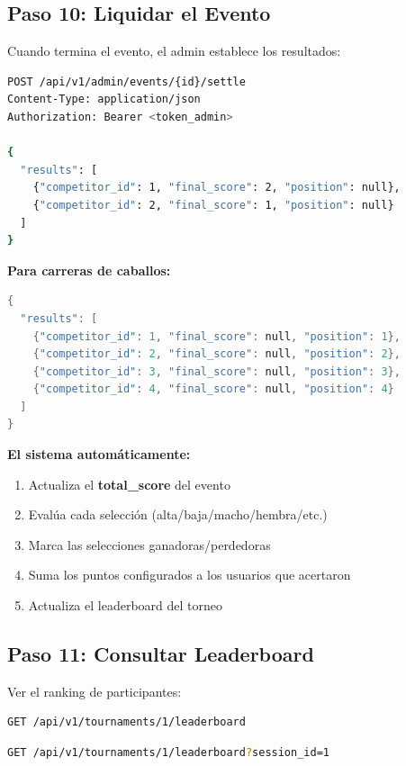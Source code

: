 \documentclass[12pt,a4paper]{article}
\begin{document}
\subsection{Paso 10: Liquidar el Evento}
Cuando termina el evento, el admin establece los resultados:

\begin{lstlisting}[language=bash]
POST /api/v1/admin/events/{id}/settle
Content-Type: application/json
Authorization: Bearer <token_admin>

{
  "results": [
    {"competitor_id": 1, "final_score": 2, "position": null},
    {"competitor_id": 2, "final_score": 1, "position": null}
  ]
}
\end{lstlisting}

\textbf{Para carreras de caballos:}
\begin{lstlisting}[language=c]
{
  "results": [
    {"competitor_id": 1, "final_score": null, "position": 1},
    {"competitor_id": 2, "final_score": null, "position": 2},
    {"competitor_id": 3, "final_score": null, "position": 3},
    {"competitor_id": 4, "final_score": null, "position": 4}
  ]
}
\end{lstlisting}

\textbf{El sistema automáticamente:}
\begin{enumerate}
    \item Actualiza el \textbf{total\_score} del evento
    \item Evalúa cada selección (alta/baja/macho/hembra/etc.)
    \item Marca las selecciones ganadoras/perdedoras
    \item Suma los puntos configurados a los usuarios que acertaron
    \item Actualiza el leaderboard del torneo
\end{enumerate}

\subsection{Paso 11: Consultar Leaderboard}
Ver el ranking de participantes:

\begin{lstlisting}[language=bash]
GET /api/v1/tournaments/1/leaderboard
\end{lstlisting}

\begin{lstlisting}[language=bash]
GET /api/v1/tournaments/1/leaderboard?session_id=1
\end{lstlisting}
\end{document}
